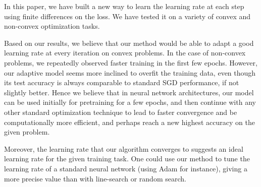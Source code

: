 \documentclass{article}
\begin{document}
  In this paper, we have built a new way to learn the learning rate at each step using finite differences on the loss. We have tested it on a variety of convex and non-convex optimization tasks. 
  
  Based on our results, we believe that our method would be able to adapt a good learning rate at every iteration on convex problems. In the case of non-convex problems, we repeatedly observed faster training in the first few epochs. However, our adaptive model seems more inclined to overfit the training data, even though its test accuracy is always comparable to standard SGD performance, if not slightly better. Hence we believe that in neural network architectures, our model can be used initially for pretraining for a few epochs, and then continue with any other standard optimization technique to lead to faster convergence and be computationally more efficient, and perhaps reach a new highest accuracy on the given problem. 
  
  Moreover, the learning rate that our algorithm converges to suggests an ideal learning rate for the given training task. One could use our method to tune the learning rate of a standard neural network (using Adam for instance), giving a more precise value than with line-search or random search.
  
  
  
  
  
  
\end{document}
